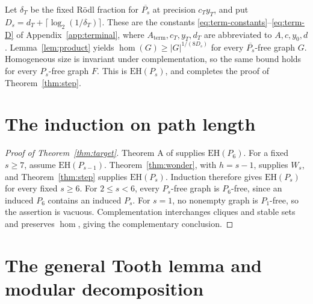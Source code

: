 \documentclass[11pt,a4paper]{article}
\theoremstyle{definition}
\theoremstyle{remark}
\numberwithin{equation}{section}
\newcommand{\EH}{\mathrm{EH}}
\begin{document}
Let \(\delta_{T}\) be the fixed R\"odl fraction for \(\overline{P_{s}}\) at precision \(c_{T}y_{T}\), and put \(D_{s}=d_{T}+\lceil \log _{2}(1/\delta_{T})\rceil\). These are the constants \eqref{eq:term-constants}--\eqref{eq:term-D} of Appendix~\ref{app:terminal}, where \(A_{\mathrm{term}},c_{T},y_{T},d_{T}\) are abbreviated to \(A,c,y_0,d\). Lemma~\ref{lem:product} yields \(\hom (G)\ge\allowbreak |G|^{1/(8D_{s})}\) for every \(\overline{P_{s}}\)-free graph \(G\). Homogeneous size is invariant under complementation, so the same bound holds for every \(P_{s}\)-free graph \(F\). This is \(\EH(P_{s})\), and completes the proof of Theorem~\ref{thm:step}.

\section{The induction on path length}\label{sec:assembly}
\begin{proof}[Proof of Theorem~\ref{thm:target}]
Theorem A of \cite{p6} supplies \(\EH(P_6)\). For a fixed \(s\ge7\), assume \(\EH(P_{s-1})\). Theorem~\ref{thm:wonder}, with \(h=s-1\), supplies \(W_s\), and Theorem~\ref{thm:step} supplies \(\EH(P_s)\). Induction therefore gives \(\EH(P_s)\) for every fixed \(s\ge6\). For \(2\le s<6\), every \(P_s\)-free graph is \(P_6\)-free, since an induced \(P_6\) contains an induced \(P_s\). For \(s=1\), no nonempty graph is \(P_1\)-free, so the assertion is vacuous. Complementation interchanges cliques and stable sets and preserves \(\hom\), giving the complementary conclusion.
\end{proof}

\clearpage\appendix


\section{The general Tooth lemma and modular decomposition}\label{app:tooth}
\end{document}
